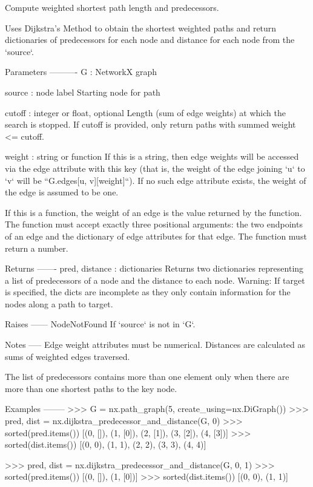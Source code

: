 \begin{DoxyVerb}Compute weighted shortest path length and predecessors.

Uses Dijkstra's Method to obtain the shortest weighted paths
and return dictionaries of predecessors for each node and
distance for each node from the `source`.

Parameters
----------
G : NetworkX graph

source : node label
    Starting node for path

cutoff : integer or float, optional
    Length (sum of edge weights) at which the search is stopped.
    If cutoff is provided, only return paths with summed weight <= cutoff.

weight : string or function
    If this is a string, then edge weights will be accessed via the
    edge attribute with this key (that is, the weight of the edge
    joining `u` to `v` will be ``G.edges[u, v][weight]``). If no
    such edge attribute exists, the weight of the edge is assumed to
    be one.

    If this is a function, the weight of an edge is the value
    returned by the function. The function must accept exactly three
    positional arguments: the two endpoints of an edge and the
    dictionary of edge attributes for that edge. The function must
    return a number.

Returns
-------
pred, distance : dictionaries
    Returns two dictionaries representing a list of predecessors
    of a node and the distance to each node.
    Warning: If target is specified, the dicts are incomplete as they
    only contain information for the nodes along a path to target.

Raises
------
NodeNotFound
    If `source` is not in `G`.

Notes
-----
Edge weight attributes must be numerical.
Distances are calculated as sums of weighted edges traversed.

The list of predecessors contains more than one element only when
there are more than one shortest paths to the key node.

Examples
--------
>>> G = nx.path_graph(5, create_using=nx.DiGraph())
>>> pred, dist = nx.dijkstra_predecessor_and_distance(G, 0)
>>> sorted(pred.items())
[(0, []), (1, [0]), (2, [1]), (3, [2]), (4, [3])]
>>> sorted(dist.items())
[(0, 0), (1, 1), (2, 2), (3, 3), (4, 4)]

>>> pred, dist = nx.dijkstra_predecessor_and_distance(G, 0, 1)
>>> sorted(pred.items())
[(0, []), (1, [0])]
>>> sorted(dist.items())
[(0, 0), (1, 1)]
\end{DoxyVerb}
 \mbox{\label{namespacenetworkx_1_1algorithms_1_1shortest__paths_1_1weighted_a5d375c09123fa049e92db19e16ce57fd}} 
